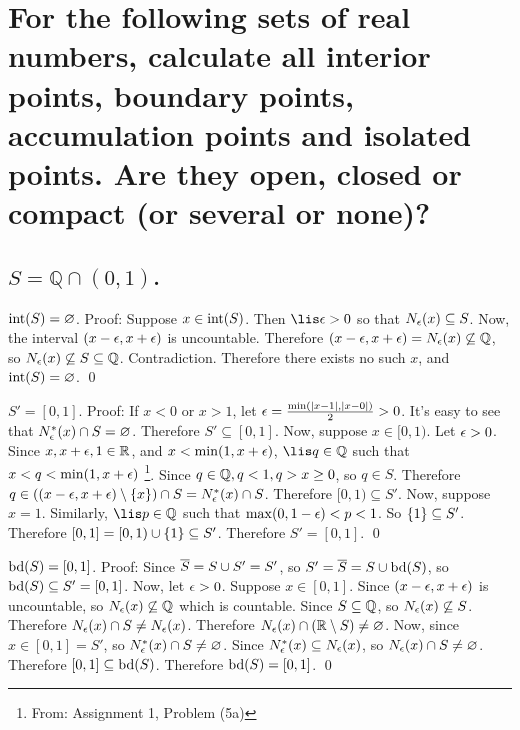 \documentclass[10pt, letterpaper, titlepage]{article}
\begin{document}
    \section{For the following sets of real numbers,  calculate all interior points, boundary points, 
      accumulation points and isolated points.  Are they open, closed or compact (or several or none)?}
      \begin{multicols}{2}
        \subsection{${S= \mathbb{Q} \cap (0,1)}$.}
          $\textrm{int}(S) = \varnothing$. Proof: 
          Suppose $x \in \textrm{int}(S)$.
          Then $\lis \e > 0$ so that $N_\epsilon(x) \subseteq S$.
          Now, the interval $(x-\epsilon, x+\epsilon)$ is uncountable.
          Therefore $(x-\epsilon, x+\epsilon) = N_\epsilon(x) \not\subseteq \mathbb{Q}$,
          so $N_\epsilon(x) \not\subseteq S \subseteq \mathbb{Q}$.
          Contradiction.
          Therefore there exists no such $x$,
          and $\textrm{int}(S) = \varnothing $.
          \qed

          $S' = [0,1]$. Proof: 
          If $x < 0$ or $x > 1$, 
          let $\epsilon = \frac{\min(\left|x-1\right|, \left|x-0\right|)}{2} > 0$.
          It's easy to see that $N_\epsilon^*(x) \cap S = \varnothing$.
          Therefore $S' \subseteq [0,1]$.
          Now, suppose $x \in [0,1)$.
          Let $\epsilon > 0$.
          Since $x, x +\epsilon, 1 \in \mathbb{R}$, and $x < \min(1, x +\epsilon)$,
          $\lis q \in \Q$ such that $x < q < \min(1, x +\epsilon)$ 
          \footnote{From: Assignment 1, Problem (5a)}.
          Since $q \in \mathbb{Q}, q < 1, q > x \geq 0$,
          so $q \in S$.
          Therefore $q \in ((x-\epsilon, x+\epsilon) \setminus \{ x \}) \cap S
          =N_\epsilon^*(x) \cap S$.
          Therefore $[0,1) \subseteq S'$.
          Now, suppose $x = 1$.
          Similarly, $\lis p \in \Q$ 
          such that $\max(0, 1-\epsilon) < p < 1$.
          So $\{ 1 \} \subseteq S'$.
          Therefore $[0,1] = [0,1) \cup \{ 1 \} \subseteq S'$.
          Therefore $S' = [0,1]$.
          \qed

          $\textrm{bd}(S) = [0,1]$. Proof: 
          Since $\overline S = S \cup S' = S'$,
          so $S' = \overline S = S \cup \textrm{bd}(S)$,
          so $\textrm{bd}(S) \subseteq S' = [0,1]$.
          Now, let $\epsilon > 0$.
          Suppose $x \in [0,1]$.
          Since $(x-\epsilon, x+\epsilon)$ is uncountable, 
          so $N_\epsilon(x) \not\subseteq \mathbb{Q}$ which is countable.
          Since $S \subseteq \mathbb{Q}$,
          so $N_\epsilon(x) \not \subseteq S$.  
          Therefore $N_\epsilon(x) \cap S \neq N_\epsilon(x)$.
          Therefore $N_\epsilon(x) \cap (\mathbb{R} \setminus S) \neq \varnothing$.
          Now, since $x \in [0,1] = S'$,
          so $N_\epsilon^*(x) \cap S \neq \varnothing$.
          Since $N_\epsilon^*(x) \subseteq N_\epsilon(x)$,
          so $N_\epsilon(x) \cap S \neq \varnothing$.
          Therefore $[0,1] \subseteq \textrm{bd}(S)$.
          Therefore $\textrm{bd}(S) = [0,1]$.
          \qed
          

\end{multicols}
\end{document}
